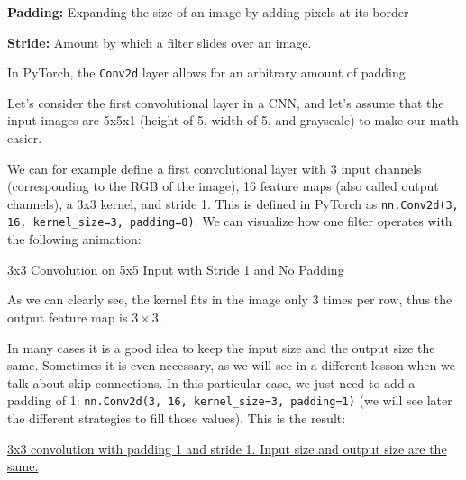 \textbf{Padding:} Expanding the size of an image by adding pixels at its border\newline

\textbf{Stride:} Amount by which a filter slides over an image.\newline

In PyTorch, the \lstinline|Conv2d| layer allows for an arbitrary amount of padding.\newline

Let's consider the first convolutional layer in a CNN, and let's assume that the input images are 5x5x1 (height of 5, width of 5, and grayscale) to make our math easier.\newline

We can for example define a first convolutional layer with 3 input channels (corresponding to the RGB of the image), 16 feature maps (also called output channels), a 3x3 kernel, and stride 1. This is defined in PyTorch as \lstinline{nn.Conv2d(3, 16, kernel_size=3, padding=0)}. We can visualize how one filter operates with the following animation:\newline


\href{run:./img/cnn/depth/i5-k3-s1-p0.gif}{3x3 Convolution on 5x5 Input with Stride 1 and No Padding}\newline

As we can clearly see, the kernel fits in the image only 3 times per row, thus the output feature map is \(3 \times 3\). \newline

In many cases it is a good idea to keep the input size and the output size the same. Sometimes it is even necessary, as we will see in a different lesson when we talk about skip connections. In this particular case, we just need to add a padding of 1: \lstinline{nn.Conv2d(3, 16, kernel_size=3, padding=1)} (we will see later the different strategies to fill those values). This is the result:\newline

\href{run:./img/cnn/depth/same-padding-no-strides.gif}{3x3 convolution with padding 1 and stride 1. Input size and output size are the same.} \newline

